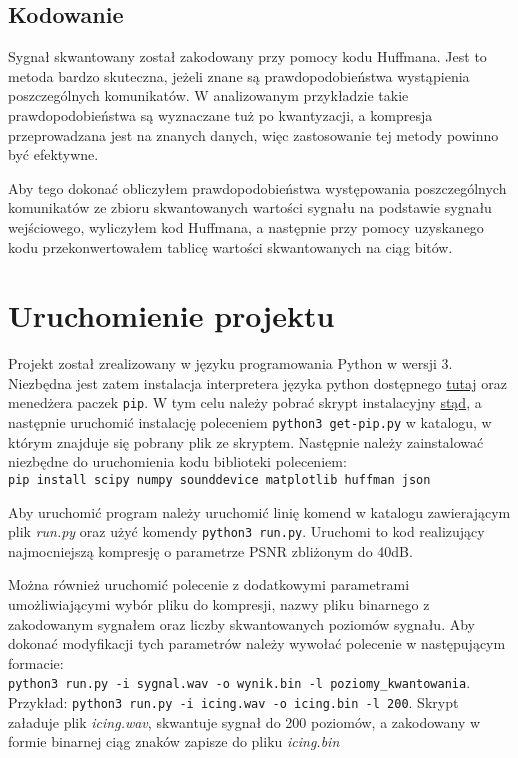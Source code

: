 \documentclass{article}
\def\code#1{\texttt{#1}}
\begin{document}
\begin{enumerate}
\subsection{Kodowanie}
Sygnał skwantowany został zakodowany przy pomocy kodu Huffmana. Jest to metoda bardzo skuteczna, jeżeli znane są prawdopodobieństwa wystąpienia poszczególnych komunikatów. W analizowanym przykładzie takie prawdopodobieństwa są wyznaczane tuż po kwantyzacji, a kompresja przeprowadzana jest na znanych danych, więc zastosowanie tej metody powinno być efektywne.

Aby tego dokonać obliczyłem prawdopodobieństwa występowania poszczególnych komunikatów ze zbioru skwantowanych wartości sygnału na podstawie sygnału wejściowego, wyliczyłem kod Huffmana, a następnie przy pomocy uzyskanego kodu przekonwertowałem tablicę wartości skwantowanych na ciąg bitów.

\section{Uruchomienie projektu}
Projekt został zrealizowany w języku programowania Python w wersji 3. 
Niezbędna jest zatem instalacja interpretera języka python dostępnego \href{https://www.python.org/downloads/windows/}{tutaj} oraz menedżera paczek \code{pip}. W tym celu należy pobrać skrypt instalacyjny \href{https://bootstrap.pypa.io/get-pip.py}{stąd}, a następnie uruchomić instalację poleceniem \code{python3 get-pip.py} w katalogu, w którym znajduje się pobrany plik ze skryptem.
Następnie należy zainstalować niezbędne do uruchomienia kodu biblioteki poleceniem: \\
\code{pip install scipy numpy sounddevice matplotlib huffman json}

Aby uruchomić program należy uruchomić linię komend w katalogu zawierającym plik \textit{run.py} oraz użyć komendy \code{python3 run.py}. Uruchomi to kod realizujący najmocniejszą kompresję o parametrze PSNR zbliżonym do 40dB.

Można również uruchomić polecenie z dodatkowymi parametrami umożliwiającymi wybór pliku do kompresji, nazwy pliku binarnego z zakodowanym sygnałem oraz liczby skwantowanych poziomów sygnału. Aby dokonać modyfikacji tych parametrów należy wywołać polecenie w następującym formacie:\\
\code{python3 run.py -i sygnal.wav -o wynik.bin -l poziomy\_kwantowania}.\\
Przykład:
\code{python3 run.py -i icing.wav -o icing.bin -l 200}. Skrypt załaduje plik \textit{icing.wav}, skwantuje sygnał do 200 poziomów, a zakodowany w formie binarnej ciąg znaków zapisze do pliku \textit{icing.bin}


\end{enumerate}
\end{document}
